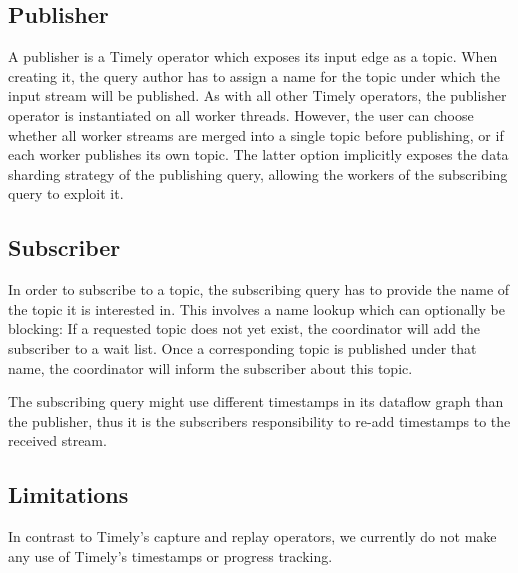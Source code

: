\subsection{Publisher}

A publisher is a Timely operator which exposes its input edge as a topic. When
creating it, the query author has to assign a name for the topic under which the
input stream will be published. As with all other Timely operators, the publisher
operator is instantiated on all worker threads. However, the user can choose
whether all worker streams are merged into a single topic before publishing, or
if each worker publishes its own topic. The latter option implicitly exposes
the data sharding strategy of the publishing query, allowing the workers of
the subscribing query to exploit it.



\subsection{Subscriber}

In order to subscribe to a topic, the subscribing query has to provide the name
of the topic it is interested in. This involves a name lookup which can optionally
be blocking: If a requested topic does not yet exist, the coordinator will add
the subscriber to a wait list. Once a corresponding topic is published under that
name, the coordinator will inform the subscriber about this topic. 

The subscribing query might use different timestamps in its dataflow graph
than the publisher, thus it is the subscribers responsibility to re-add
timestamps to the received stream. 



\subsection{Limitations}

In contrast to Timely's capture and replay operators, we currently do not make
any use of Timely's timestamps or progress tracking. 

